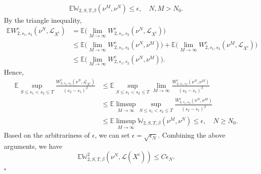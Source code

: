 \documentclass[12pt]{article}
\def\L{\mathscr{L}}
\def\E{\mathbb E}
\def\W{\mathbb{W}}
\newenvironment{proof}{{\noindent\it Proof.}\ }{\hfill $\square$\par}
\numberwithin{equation}{section}
\begin{document}
\begin{proof}
\begin{align*}
				\E\W_{2,S,T,\beta}(\nu^M,\nu^N)\leq \epsilon, \quad N,M>N_0.
			\end{align*}
			By the triangle inequality,
			\begin{align*}
				\E W_{2,s_1,s_2}^c(\nu^N,\L_{X^i})&=\E\big( \lim_{M\to \infty}W_{2,s_1,s_2}^c(\nu^N,\L_{X^i})\big)\\
				&\leq \E\big( \lim_{M\to \infty}W_{2,s_1,s_2}^c(\nu^N,\nu^M)\big)+\E \big( \lim_{M\to \infty}W_{2,s_1,s_2}^c(\nu^M,\L_{X^i})\big)\\
				&\leq \E \big( \lim_{M\to \infty}W_{2,s_1,s_2}^c(\nu^N,\nu^M)\big).
			\end{align*}
			Hence,
			\begin{align*}
				\E\sup_{S\leq s_1<s_2\leq T}\frac{W^c_{2,s_1,s_2}(\nu^N,\L_{X^i})}{(s_2-s_1)^{\beta}}&\leq \E\sup_{S\leq s_1<s_2\leq T}\lim_{M\to \infty}\frac{W_{2,s_1,s_2}^c(\nu^N,\nu^M)}{(s_2-s_1)^{\beta}}\\
				&\leq \E\limsup_{M \to \infty}\sup_{S\leq s_1<s_2\leq T}\frac{W_{2,s_1,s_2}^c(\nu^N,\nu^M)}{(s_2-s_1)^{\beta}}\\
				&\leq \E\limsup_{M \to \infty}\W_{2,S,T,\beta}(\nu^M,\nu^N)\leq \epsilon,\quad N\geq N_0.
			\end{align*}
			Based on the arbitrariness of $\epsilon$, we can set $\epsilon=\sqrt{\epsilon_N}$.
			Combining the above arguments, we have
			\begin{equation}
				\E\W^2_{2,S,T,\beta}(\nu^N,\L(X^i))\leq C\epsilon_N.
			\end{equation}
		\end{proof}

	
	
\end{document}
